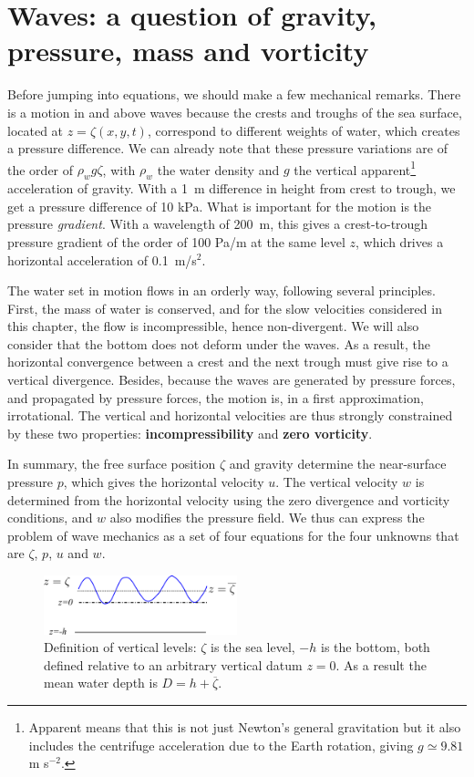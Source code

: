 \section{Waves: a question of gravity, pressure, mass and vorticity}
Before jumping into equations, we should make a few mechanical remarks. 
There is a motion in and above waves because the crests and troughs of the sea surface, located at $z=\zeta(x,y,t)$, 
correspond to different weights of water, which 
creates a pressure difference. We can already note that these pressure variations 
are of the order of $\rho_w g \zeta$, with $\rho_w$ the water density and $g$ the vertical apparent\footnote{Apparent means that 
this is not just Newton's general gravitation but it also includes the centrifuge acceleration due to the Earth rotation, giving 
$g \simeq 9.81$m s$^{-2}$.} acceleration of gravity. With a 1~m difference in height from crest to trough, 
we get a pressure difference of 10 kPa. What is important for the motion is the pressure \emph{gradient}. With a wavelength 
of 200~m, this gives a crest-to-trough pressure gradient of the order of 100 Pa/m at the same level $z$, 
which drives a horizontal acceleration of 0.1~m/s$^2$. 

The water set in motion flows in an orderly way, following several principles. 
First, the mass of water is conserved, and for the slow velocities considered in this chapter, the flow is 
incompressible, hence non-divergent. We will also consider that the bottom does not deform under the waves. 
As a result, the horizontal convergence between a crest and the next trough must give 
rise to a vertical divergence. Besides, because the waves are generated by pressure forces, and propagated by pressure forces, 
the motion is, in a first approximation, irrotational. The vertical and horizontal velocities are thus strongly constrained by 
these two properties: \textbf{incompressibility} and \textbf{zero vorticity}.

In summary, the free surface position $\zeta$ and gravity determine the near-surface pressure $p$, which gives the horizontal velocity $u$. 
The vertical velocity $w$ is determined from the horizontal velocity using the 
zero divergence and vorticity conditions, and $w$ also modifies the pressure field. We thus can express 
the problem of wave mechanics as a set of four equations for the four unknowns that are $\zeta$, $p$, $u$ and $w$. 
\begin{figure}
\centerline{\includegraphics[width=0.5\textwidth]{FIGS_CH_AIRY/vertical_coord_def.pdf}}
  \caption{Definition of vertical levels: $\zeta$ is the sea level, $-h$ is the bottom, both defined relative to an arbitrary vertical datum $z=0$. As a result the
mean water depth is $D=h+\overline{\zeta}$.}
\label{fig:Dandh}
\end{figure}


